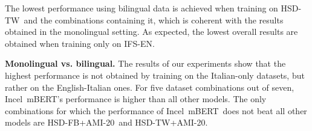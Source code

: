 \documentclass[11pt]{article}
\newcommand{\dsENclassification}{IFS-EN}
\newcommand{\dsITclassification}{IFS-IT}
\newcommand{\mbert}{\mbox{mBERT$_{base}$}}
\newcommand{\imbert}{\mbox{Incel mBERT}}
\newcommand{\hsdfb}{\mbox{HSD-FB}}
\newcommand{\hsdtw}{\mbox{HSD-TW}}
\newcommand{\ami}{\mbox{AMI-20}}
\begin{document}
The lowest performance using bilingual data is achieved when training on \hsdtw\, and the combinations containing it, which is coherent with the results obtained in the monolingual setting. As expected, the lowest overall results are obtained when training only on \dsENclassification.


\vspace*{1mm}
\noindent\textbf{Monolingual vs. bilingual.}
The results of our experiments show that the highest performance is not obtained by training on the Italian-only datasets, but rather on the English-Italian ones. For five dataset combinations out of seven, \imbert's performance is higher than all other models.
The only combinations for which the performance of \imbert\, does not beat all other models are \hsdfb+\ami\, and \hsdtw+\ami.
\end{document}
